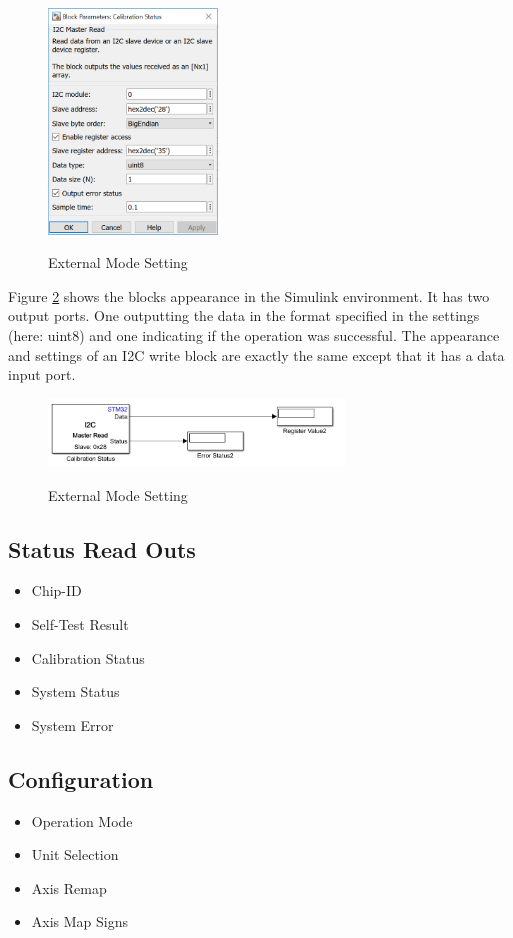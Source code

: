 \documentclass[a4paper]{article}
\begin{document}
\begin{figure}[htb]
\centering
	{\includegraphics*[trim=0mm 0mm 0mm 0mm,width=0.4\textwidth]{i2cdia}}
	\caption{External Mode Setting }
	\label{i2cdia}
\end{figure}

Figure \ref{i2cread} shows the blocks appearance in the Simulink environment. It has two output ports. One outputting the data in the format specified in the settings (here: uint8) and one indicating if the operation was successful. The appearance and settings of an I2C write block are exactly the same except that it has a data input port.

\begin{figure}[htb]
\centering
	{\includegraphics*[trim=0mm 0mm 0mm 0mm,width=0.7\textwidth]{i2cread}}
	\caption{External Mode Setting }
	\label{i2cread}
\end{figure}




\subsection{Status Read Outs}
\begin{itemize}
\item Chip-ID
\item Self-Test Result
\item Calibration Status
\item System Status
\item System Error
\end{itemize}

\subsection{Configuration}
\begin{itemize}
\item Operation Mode
\item Unit Selection
\item Axis Remap
\item Axis Map Signs
\end{itemize}
\end{document}
